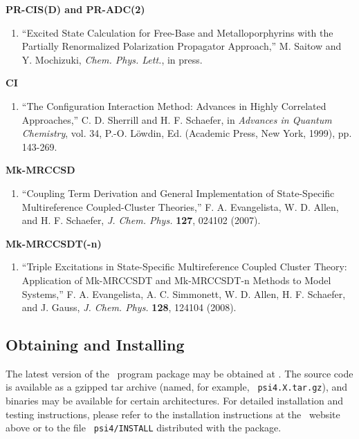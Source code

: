 {\bf PR-CIS(D) and PR-ADC(2)} 
\begin{enumerate}
\item ``Excited State Calculation for Free-Base and Metalloporphyrins with
  the Partially Renormalized Polarization Propagator Approach,''
  M. Saitow and Y. Mochizuki, {\em Chem. Phys. Lett.}, in press.
\end{enumerate}

{\bf CI} 
\begin{enumerate}
\item ``The Configuration Interaction Method: Advances in Highly 
   Correlated Approaches,'' C. D. Sherrill and H. F. Schaefer, in
   {\em Advances in Quantum Chemistry}, vol. 34, P.-O. L{\"o}wdin, Ed.
   (Academic Press, New York, 1999), pp. 143-269.
\end{enumerate}

{\bf Mk-MRCCSD} 
\begin{enumerate}
\item ``Coupling Term Derivation and General Implementation of
  State-Specific Multireference Coupled-Cluster Theories,''
  F. A. Evangelista, W. D. Allen, and H. F. Schaefer, 
  {\em J. Chem. Phys.} {\bf 127}, 024102 (2007).
\end{enumerate}

{\bf Mk-MRCCSDT(-n)} 
\begin{enumerate}
\item ``Triple Excitations in State-Specific Multireference Coupled
  Cluster Theory: Application of Mk-MRCCSDT and Mk-MRCCSDT-n Methods to
  Model Systems,'' F. A. Evangelista, A. C. Simmonett, W. D. Allen,
  H. F. Schaefer, and J. Gauss, {\em J. Chem. Phys.} {\bf 128}, 124104
  (2008).
\end{enumerate}

\subsection{Obtaining and Installing \PSIfour}
\label{installation}

The latest version of the \PSIfour\ program package may be obtained at
.  The
source code is available as a gzipped tar archive (named, for example, {\tt
psi4.X.tar.gz}), and binaries may be available for certain architectures.
For detailed installation and testing instructions, please refer to the
installation instructions at the \PSIfour\ website above or to the file {\tt
psi4/INSTALL} distributed with the package.

